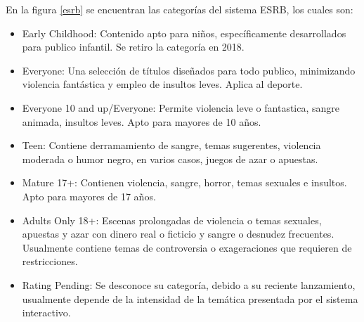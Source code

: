 En la figura \ref{esrb} se encuentran las categorías del sistema ESRB, los cuales son:
\begin{itemize}
	\item Early Childhood: Contenido apto para niños, específicamente desarrollados para publico infantil. Se retiro la categoría en 2018.
	\item Everyone: Una selección de títulos diseñados para todo publico, minimizando violencia fantástica y empleo de insultos leves. Aplica al deporte.
	\item Everyone 10 and up/Everyone: Permite violencia leve o fantastica, sangre animada, insultos leves. Apto para mayores de 10 años.
	\item Teen: Contiene derramamiento de sangre, temas sugerentes, violencia moderada o humor negro, en varios casos, juegos de azar o apuestas.
	\item Mature 17+: Contienen violencia, sangre, horror, temas sexuales e insultos. Apto para mayores de 17 años.
	\item Adults Only 18+: Escenas prolongadas de violencia o temas sexuales, apuestas y azar con dinero real o ficticio y sangre o desnudez frecuentes. Usualmente contiene temas de controversia o exageraciones que requieren de restricciones.
	\item Rating Pending: Se desconoce su categoría, debido a su reciente lanzamiento, usualmente depende de la intensidad de la temática presentada por el sistema interactivo.
\end{itemize}

